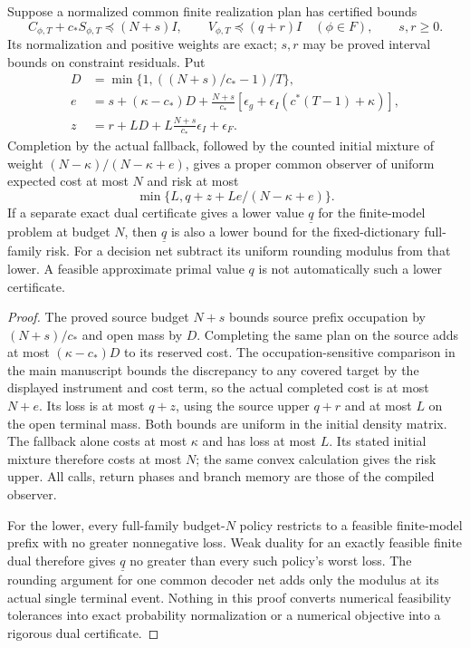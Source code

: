 \begin{proposition}\label{prop:supp-solver}
Suppose a normalized common finite realization plan has certified bounds
\[
 C_{\phi,T}+c_*S_{\phi,T}\preccurlyeq(N+s)I,
 \qquad V_{\phi,T}\preccurlyeq(q+r)I\quad(\phi\in F),
 \qquad s,r\ge0.
\]
Its normalization and positive weights are exact; $s,r$ may be proved interval bounds on constraint residuals. Put
\begin{align*}
 D&=\min\{1,((N+s)/c_*-1)/T\},\\
 e&=s+(\kappa-c_*)D+\frac{N+s}{c_*}
          [\epsilon_g+\epsilon_I(c^*(T-1)+\kappa)],\\
 z&=r+LD+L\frac{N+s}{c_*}\epsilon_I+\epsilon_F.
\end{align*}
Completion by the actual fallback, followed by the counted initial mixture of weight $(N-\kappa)/(N-\kappa+e)$, gives a proper common observer of uniform expected cost at most $N$ and risk at most
\[
 \min\{L,q+z+Le/(N-\kappa+e)\}.
\]
If a separate exact dual certificate gives a lower value $\underline q$ for the finite-model problem at budget $N$, then $\underline q$ is also a lower bound for the fixed-dictionary full-family risk. For a decision net subtract its uniform rounding modulus from that lower. A feasible approximate primal value $q$ is not automatically such a lower certificate.
\end{proposition}
\begin{proof}
The proved source budget $N+s$ bounds source prefix occupation by $(N+s)/c_*$ and open mass by $D$. Completing the same plan on the source adds at most $(\kappa-c_*)D$ to its reserved cost. The occupation-sensitive comparison in the main manuscript bounds the discrepancy to any covered target by the displayed instrument and cost term, so the actual completed cost is at most $N+e$. Its loss is at most $q+z$, using the source upper $q+r$ and at most $L$ on the open terminal mass. Both bounds are uniform in the initial density matrix. The fallback alone costs at most $\kappa$ and has loss at most $L$. Its stated initial mixture therefore costs at most $N$; the same convex calculation gives the risk upper. All calls, return phases and branch memory are those of the compiled observer.

For the lower, every full-family budget-$N$ policy restricts to a feasible finite-model prefix with no greater nonnegative loss. Weak duality for an exactly feasible finite dual therefore gives $\underline q$ no greater than every such policy's worst loss. The rounding argument for one common decoder net adds only the modulus at its actual single terminal event. Nothing in this proof converts numerical feasibility tolerances into exact probability normalization or a numerical objective into a rigorous dual certificate.
\end{proof}

